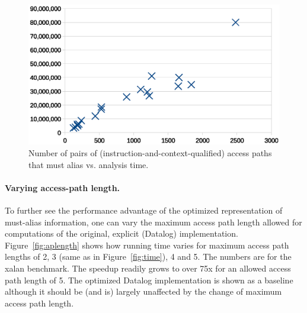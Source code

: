 \begin{figure}[h]
  \begin{minipage}[b]{\linewidth}
    \centering
    \includegraphics[clip,width=\linewidth]{assets/must-data/pairs.eps}
  \end{minipage}
  \caption{Number of pairs of (instruction-and-context-qualified) access paths that must alias vs. analysis time.}
    \label{fig:pairs}
\end{figure}



\paragraph{Varying access-path length.} To further see the performance
advantage of the optimized representation of must-alias information,
one can vary the maximum access path length allowed for computations
of the original, explicit (Datalog) implementation.
Figure~\ref{fig:aplength} shows how running time varies for maximum
access path lengths of 2, 3 (same as in Figure~\ref{fig:time}), 4 and
5. The numbers are for the xalan benchmark. The speedup readily grows
to over 75x for an allowed access path length of 5. The optimized
Datalog implementation is shown as a baseline although it should be (and
is) largely unaffected by the change of maximum access path length.

